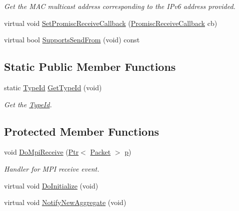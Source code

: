 \begin{DoxyCompactItemize}
\begin{DoxyCompactList}\small\item\em Get the M\+AC multicast address corresponding to the I\+Pv6 address provided. \end{DoxyCompactList}\item 
virtual void \hyperlink{classns3_1_1PointToPointNetDevice_a93b5139ffbc0c0d47b91b2e1a386517f}{Set\+Promisc\+Receive\+Callback} (\hyperlink{classns3_1_1NetDevice_a427225795919f26c414bee2ea3f31ed2}{Promisc\+Receive\+Callback} cb)
\item 
virtual bool \hyperlink{classns3_1_1PointToPointNetDevice_ae829ffb7aa82b9691da34055f17012eb}{Supports\+Send\+From} (void) const 
\end{DoxyCompactItemize}
\subsection*{Static Public Member Functions}
\begin{DoxyCompactItemize}
\item 
static \hyperlink{classns3_1_1TypeId}{Type\+Id} \hyperlink{classns3_1_1PointToPointNetDevice_a045e48d24e615c82db1a9a952a9725b5}{Get\+Type\+Id} (void)
\begin{DoxyCompactList}\small\item\em Get the \hyperlink{classns3_1_1TypeId}{Type\+Id}. \end{DoxyCompactList}\end{DoxyCompactItemize}
\subsection*{Protected Member Functions}
\begin{DoxyCompactItemize}
\item 
void \hyperlink{classns3_1_1PointToPointNetDevice_adb881a073eaa215d5b8c8dc0434a0690}{Do\+Mpi\+Receive} (\hyperlink{classns3_1_1Ptr}{Ptr}$<$ \hyperlink{classns3_1_1Packet}{Packet} $>$ \hyperlink{lte__link__budget__x2__handover__measures_8m_ac9de518908a968428863f829398a4e62}{p})
\begin{DoxyCompactList}\small\item\em Handler for M\+PI receive event. \end{DoxyCompactList}\item 
virtual void \hyperlink{classns3_1_1PointToPointNetDevice_aa335985c467bd076770a45ccfac5dbff}{Do\+Initialize} (void)
\item 
virtual void \hyperlink{classns3_1_1PointToPointNetDevice_a52d910c82aac9f65a7dc42e1431c9bcd}{Notify\+New\+Aggregate} (void)
\end{DoxyCompactItemize}
